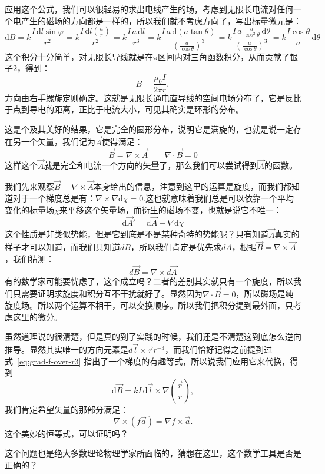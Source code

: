 \documentclass[UTF8]{ctexbook}
\begin{document}
应用这个公式，我们可以很轻易的求出电线产生的场，考虑到无限长电流对任何一个电产生的磁场的方向都是一样的，所以我们就不考虑方向了，写出标量微元是：
\[
    \mathrm{d}B
    =k\frac{I\,\mathrm{d}l\sin\varphi}{r^2}
    =k\frac{I\,\mathrm{d}l\left(\frac{a}{r}\right)}{r^2}
    =k\frac{I\,a\,\mathrm{d}l}{r^3}
    =k\frac{I\,a\,\mathrm{d}(a\tan\theta)}{\left(\frac{a}{\cos\theta}\right)^3}
    =k\frac{I\,a\,\frac{a}{\cos^2\theta}\,\mathrm{d}\theta}{\left(\frac{a}{\cos\theta}\right)^3}
    =k\frac{I\cos\theta}{a}\,\mathrm{d}\theta
\]
这个积分十分简单，对无限长导线就是在$\pi$区间内对三角函数积分，从而贡献了银子$2$，得到：
\[
B=\frac{\mu_0 I}{2\pi r},
\]
方向由右手螺旋定则确定。这就是无限长通电直导线的空间电场分布了，它是反比于点到导电的距离，正比于电流大小，可见其确实是环形的分布。

这是个及其美好的结果，它是完全的圆形分布，说明它是满旋的，也就是说一定存在另一个矢量，我们记为$\vec{A}$使得满足：
\[
\vec{B}=\nabla \times \vec{A} \qquad \nabla \cdot \vec{B} =0
\]
这样这个$\vec{A}$就是完全和电流一个方向的矢量了，那么我们可以尝试得到$\vec{A}$的函数。

我们先来观察$\vec{B}=\nabla \times \vec{A}$本身给出的信息，注意到这里的运算是旋度，而我们都知道对于一个梯度总是有：$\nabla \times \nabla \mathrm{d}\chi = 0.$这也就意味着我们总是可以依靠一个平均变化的标量场$\chi$来平移这个矢量场，而衍生的磁场不变，也就是说它不唯一：
\[
\mathrm{d}\vec{A}' = \mathrm{d}\vec{A} + \nabla \mathrm{d}\chi
\]
这个性质是非类似势能，但是它到底是不是某种奇特的势能呢？只有知道$\vec{A}$真实的样子才可以知道，而我们只知道$dB$，所以我们肯定是优先求$dA$，根据$\vec{B}=\nabla \times \vec{A}$，我们猜测：
\[
d\vec{B}=\nabla \times d\vec{A} 
\]
有的数学家可能要忧虑了，这个成立吗？二者的差别其实就只有一个旋度，所以我们只需要证明求旋度和积分互不干扰就好了。显然因为$\nabla \cdot \vec{B} =0$，所以磁场是纯旋度场。所以两个运算不相干，可以交换顺序。所以我们把积分提到最外面，只考虑这里的微分。

虽然道理说的很清楚，但是真的到了实践的时候，我们还是不清楚这到底怎么逆向推导。显然其实唯一的方向元素是$d\vec{l} \times \vec{r}r^{-3}$，而我们恰好记得之前提到过式~\eqref{eq:grad-f-over-r3} 指出了一个梯度的有趣等式，所以说我们应用它来代换，得到
\[
\mathrm d\vec{B}
=kI\,\mathrm d\vec{l}\times\nabla(\frac{ \vec{r}}{r}),
\]
我们肯定希望矢量的那部分满足：
\[
\nabla\times(f\vec{a})=\nabla f\times\vec{a}.
\]
这个美妙的恒等式，可以证明吗？

这个问题也是绝大多数理论物理学家所面临的，猜想在这里，这个数学工具是否是正确的？
\end{document}
